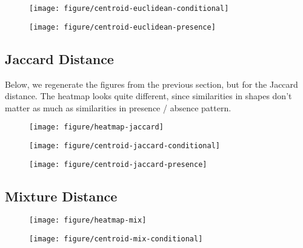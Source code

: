 \documentclass{article}
\begin{document}
\begin{figure}[ht]
  \centering
  \texttt{[image: figure/centroid-euclidean-conditional]}
  \caption{\label{fig:centroid-euclidean-conditional} }
\end{figure}

\begin{figure}[ht]
  \centering
  \texttt{[image: figure/centroid-euclidean-presence]}
  \caption{\label{fig:centroid-euclidean-presence} }
\end{figure}

\subsection{Jaccard Distance}

Below, we regenerate the figures from the previous section, but for the Jaccard
distance. The heatmap looks quite different, since similarities in shapes don't
matter as much as similarities in presence / absence pattern.

\begin{figure}[ht]
  \centering
  \texttt{[image: figure/heatmap-jaccard]}
  \caption{\label{fig:heatmap-jaccard} }
\end{figure}

\begin{figure}[ht]
  \centering
  \texttt{[image: figure/centroid-jaccard-conditional]}
  \caption{\label{fig:centroid-jaccard-conditional} }
\end{figure}

\begin{figure}[ht]
  \centering
  \texttt{[image: figure/centroid-jaccard-presence]}
  \caption{\label{fig:centroid-jaccard-conditional} }
\end{figure}

\subsection{Mixture Distance}

\begin{figure}[ht]
  \centering
  \texttt{[image: figure/heatmap-mix]}
  \caption{\label{fig:heatmap-mix} }
\end{figure}

\begin{figure}[ht]
  \centering
  \texttt{[image: figure/centroid-mix-conditional]}
  \caption{\label{fig:centroid-mix-conditional} }
\end{figure}
\end{document}
